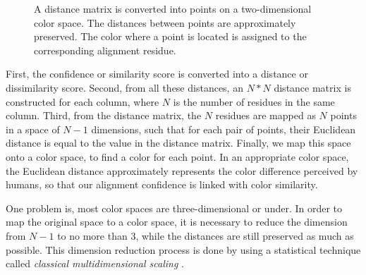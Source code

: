 \begin{figure}[hbt]
\caption[Conversion from Distance Matrix into Colors]{A distance matrix is converted into points on a two-dimensional color space. The distances between points are approximately preserved. The color where a point is located is assigned to the corresponding alignment residue.}\label{fig:chap2_color}
\end{figure}

First, the confidence or similarity score is converted into a distance or dissimilarity score. Second, from all these distances, an $N*N$ distance matrix is constructed for each column, where $N$ is the number of residues in the same column. Third, from the distance matrix, the $N$ residues are mapped as $N$ points in a space of $N-1$ dimensions, such that for each pair of points, their Euclidean distance is equal to the value in the distance matrix. Finally, we map this space onto a color space, to find a color for each point. In an appropriate color space, the Euclidean distance approximately represents the color difference perceived by humans, so that our alignment confidence is linked with color similarity.

One problem is, most color spaces are three-dimensional or under. In order to map the original space to a color space, it is necessary to reduce the dimension from $N-1$ to no more than 3, while the distances are still preserved as much as possible. This dimension reduction process is done by using a statistical technique called \emph{classical multidimensional scaling} \cite{Borg:1997aa}.

